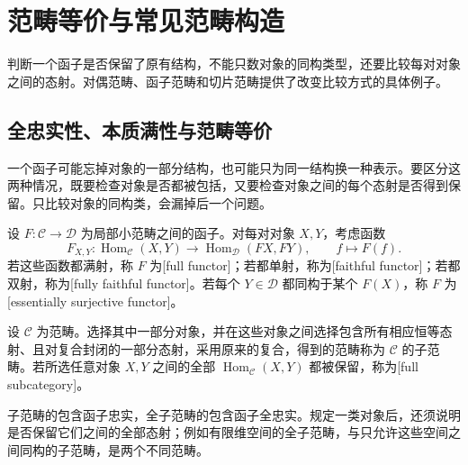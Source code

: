 
\section{范畴等价与常见范畴构造}
\label{b4:sec:0103}

判断一个函子是否保留了原有结构，不能只数对象的同构类型，还要比较每对对象之间的态射。对偶范畴、函子范畴和切片范畴提供了改变比较方式的具体例子。

%
%

\subsection{全忠实性、本质满性与范畴等价}
\label{b4:subsec:0103:01}

一个函子可能忘掉对象的一部分结构，也可能只为同一结构换一种表示。要区分这两种情况，既要检查对象是否都被包括，又要检查对象之间的每个态射是否得到保留。只比较对象的同构类，会漏掉后一个问题。

\begin{definition}\label{b4:def:fully-faithful-essentially-surjective}
	设 \(F:\mathcal C\rightarrow\mathcal D\) 为局部小范畴之间的函子。对每对对象 \(X,Y\)，考虑函数
	\[
		F_{X,Y}:\operatorname{Hom}_{\mathcal C}(X,Y)\longrightarrow\operatorname{Hom}_{\mathcal D}(FX,FY), \qquad f\longmapsto F(f).
	\]
	若这些函数都满射，称 \(F\) 为[full functor]；若都单射，称为[faithful functor]；若都双射，称为[fully faithful functor]。若每个 \(Y\in\mathcal D\) 都同构于某个 \(F(X)\)，称 \(F\) 为[essentially surjective functor]。
\end{definition}

\begin{definition}\label{b4:def:subcategory}
	设 \(\mathcal C\) 为范畴。选择其中一部分对象，并在这些对象之间选择包含所有相应恒等态射、且对复合封闭的一部分态射，采用原来的复合，得到的范畴称为 \(\mathcal C\) 的子范畴。若所选任意对象 \(X,Y\) 之间的全部 \(\operatorname{Hom}_{\mathcal C}(X,Y)\) 都被保留，称为[full subcategory]。
\end{definition}

子范畴的包含函子忠实，全子范畴的包含函子全忠实。规定一类对象后，还须说明是否保留它们之间的全部态射；例如有限维空间的全子范畴，与只允许这些空间之间同构的子范畴，是两个不同范畴。

